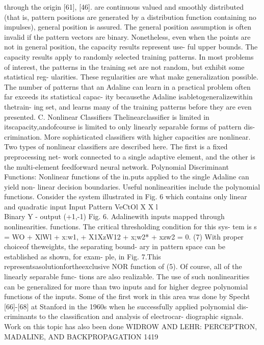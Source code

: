 through the origin {[}61{]}, {[}46{]}. are continuous valued and
smoothly distributed (that is, pattern positions are generated by a
distribution function containing no impulses), general position is
assured. The general position assumption is often invalid if the pattern
vectors are binary. Nonetheless, even when the points are not in general
position, the capacity results represent use- ful upper bounds. The
capacity results apply to randomly selected training patterns. In most
problems of interest, the patterns in the training set are not random,
but exhibit some statistical reg- ularities. These regularities are what
make generalization possible. The number of patterns that an Adaline can
learn in a practical problem often far exceeds its statistical capac-
ity becausethe Adaline isabletogeneralizewithin thetrain- ing set, and
learns many of the training patterns before they are even presented. C.
Nonlinear Classifiers Thelinearclassifier is limited in
itscapacity,andofcourse is limited to only linearly separable forms of
pattern dis- crimination. More sophisticated classifiers with higher
capacities are nonlinear. Two types of nonlinear classifiers are
described here. The first is a fixed preprocessing net- work connected
to a single adaptive element, and the other is the multi-element
feedforward neural network. Polynomial Discriminant Functions: Nonlinear
functions of the in.puts applied to the single Adaline can yield non-
linear decision boundaries. Useful nonlinearities include the polynomial
functions. Consider the system illustrated in Fig. 6 which contains only
linear and quadratic input Input Pattern VeCtOl X X l\\
Binary Y - output (+1,-1) Fig. 6. Adalinewith inputs mapped through
nonlinearities. functions. The critical thresholding condition for this
sys- tem is s = WO + XlWl + x:w1, + X1XzW12 + x;w2* + xzw2 = 0. (7) With
proper choiceof theweights, the separating bound- ary in pattern space
can be established as shown, for exam- ple, in Fig. 7.This
representsasolutionfortheexclusive NOR function of (5). Of course, all
of the linearly separable func- tions are also realizable. The use of
such nonlinearities can be generalized for more than two inputs and for
higher degree polynomial functions of the inputs. Some of the first work
in this area was done by Specht {[}66{]}-{[}68{]} at Stanford in the
1960s when he successfully applied polynomial dis- criminants to the
classification and analysis of electrocar- diographic signals. Work on
this topic has also been done WIDROW AND LEHR: PERCEPTRON, MADALINE, AND
BACKPROPAGATION 1419

